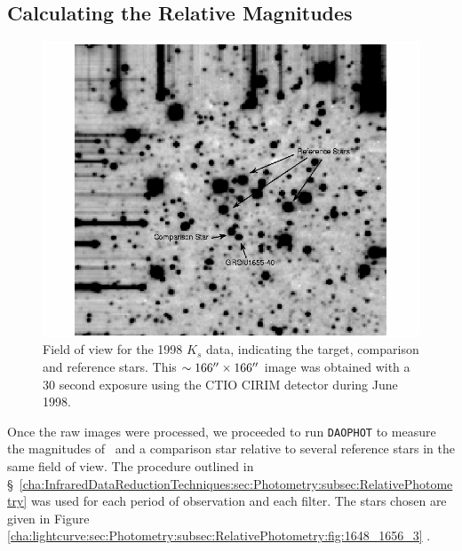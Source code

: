 
\subsection{Calculating the Relative Magnitudes}\label{cha:lightcurve:sec:Photometry:subsec:RelativePhotometry}

\begin{figure}[!htb]
\begin{center}
\includegraphics[width=5.0in]{1648_1656_3}
\caption{%
Field of view for the 1998 $K_s$ data, indicating the target,
comparison and reference stars. This $\sim 166\hbox{$^{\prime\prime}$} \times
166\hbox{$^{\prime\prime}$}$ image was obtained with a 30 second exposure using the
CTIO CIRIM detector during June 1998. }\label{cha:lightcurve:sec:Photometry:subsec:RelativePhotometry:fig:1648_1656_3}
\end{center}
\end{figure}

Once the raw images were processed, we proceeded to run \texttt{DAOPHOT} to measure the magnitudes of \groj\ and a comparison star relative to several reference stars in the same field of view. The procedure outlined in \S~\ref{cha:InfraredDataReductionTechniques:sec:Photometry:subsec:RelativePhotometry} was  used for each period of observation and each filter. The stars chosen are given in Figure~%
\vref{cha:lightcurve:sec:Photometry:subsec:RelativePhotometry:fig:1648_1656_3}%
. %

